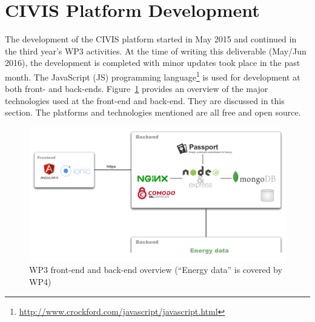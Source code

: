 \section{CIVIS Platform  Development} 
 
The development of the CIVIS platform started in May 2015 \citep{Huang2015c} and continued in the third year's WP3 activities. At the time of writing this deliverable (May/Jun 2016), the development is completed with minor updates took place in the past month.
% 
The JavaScript (JS) programming language\footnote{\url{http://www.crockford.com/javascript/javascript.html}} is used for development at both front- and back-ends. 
Figure~\ref{fig:ScreenShot2015-11-09at18} provides an overview of the major technologies used at the front-end and back-end. They are discussed in this section. 
The platforms and technologies mentioned are all free and open source. 

\begin{figure}[h!]
\centering
\includegraphics[width=0.9\linewidth]{img/tech}
\caption{WP3 front-end and back-end overview (``Energy data'' is covered by WP4)}
\label{fig:ScreenShot2015-11-09at18}
\end{figure}






